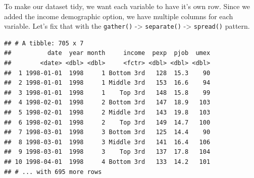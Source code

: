 \documentclass[]{book}
\newenvironment{Shaded}{\begin{snugshade}}{\end{snugshade}}
\newcommand{\KeywordTok}[1]{\textcolor[rgb]{0.13,0.29,0.53}{\textbf{{#1}}}}
\newcommand{\DataTypeTok}[1]{\textcolor[rgb]{0.13,0.29,0.53}{{#1}}}
\newcommand{\StringTok}[1]{\textcolor[rgb]{0.31,0.60,0.02}{{#1}}}
\newcommand{\NormalTok}[1]{{#1}}
\theoremstyle{definition}
\theoremstyle{definition}
\theoremstyle{remark}
\begin{document}
To make our dataset tidy, we want each variable to have it's own row.
Since we added the income demographic option, we have multiple columns
for each variable. Let's fix that with the \texttt{gather()}
-\textgreater{} \texttt{separate()} -\textgreater{} \texttt{spread()}
pattern.

\begin{Shaded}
\end{Shaded}

\begin{verbatim}
## # A tibble: 705 x 7
##          date  year month     income  pexp  pjob  umex
##        <date> <dbl> <dbl>     <fctr> <dbl> <dbl> <dbl>
##  1 1998-01-01  1998     1 Bottom 3rd   128  15.3    90
##  2 1998-01-01  1998     1 Middle 3rd   153  16.6    94
##  3 1998-01-01  1998     1    Top 3rd   148  15.8    99
##  4 1998-02-01  1998     2 Bottom 3rd   147  18.9   103
##  5 1998-02-01  1998     2 Middle 3rd   143  19.8   103
##  6 1998-02-01  1998     2    Top 3rd   149  14.7   100
##  7 1998-03-01  1998     3 Bottom 3rd   125  14.4    90
##  8 1998-03-01  1998     3 Middle 3rd   141  16.4   106
##  9 1998-03-01  1998     3    Top 3rd   137  17.8   104
## 10 1998-04-01  1998     4 Bottom 3rd   133  14.2   101
## # ... with 695 more rows
\end{verbatim}
\end{document}
